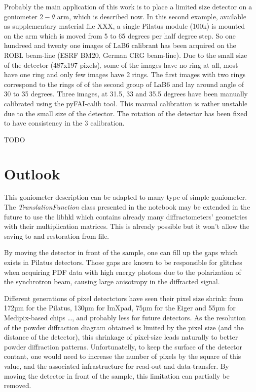 \documentclass[preprint]{iucr}              %
\begin{document}
Probably the main application of this work is to place a limited size detector
on a goniometer $2-\theta$ arm, which is described now.
In this second example, available as supplementary material file XXX, a single
Pilatus module (100k) is mounted on the arm which is moved from 5 to 65 degrees per half
degree step. 
So one hundreed and twenty one images of LaB6 calibrant has been acquired on the
ROBL beam-line (ESRF BM20, German CRG beam-line).
Due to the small size of the detector (487x197 pixels),
some of the images have no ring at all, most have one ring and only few images
have 2 rings.
The first images with two rings correspond to the rings of of the second group
of LaB6 and lay around angle of 30 to 35 degrees.
Three images, at 31.5, 33 and 35.5 degrees have been manually calibrated using
the pyFAI-calib tool.
This manual calibration is rather unstable due to the small size of the
detector. 
The rotation of the detector has been fixed to have consistency in the 3
calibration.

TODO

\section{Outlook}

This goniometer description can be adapted to many type of simple goniometer.
The \textit{TranslationFunction} class presented in the notebook may be extended
in the future to use the libhkl\cite{picca} which contains already many
diffractometers' geometries with their multiplication matrices. 
This is already possible but it won't allow the saving to and restoration from
file. 

By moving the detector in front of the sample, one can fill up the
gaps which exists in Pilatus detectors. Those gaps are known to be responsible for glitches
when acquiring PDF data with high energy photons due to the
polarization of the synchrotron beam, causing large anisotropy in the
diffracted signal.

Different generations of pixel detectctors have seen their pixel size
shrink:
from 172µm for the Pilatus, 130µm for ImXpad, 75µm for the Eiger and 55µm for
Medipix-based chips \ldots, and probably less for future detectors. 
As the resolution of the powder diffraction diagram obtained is limited by the
pixel size (and the distance of the detector), this shrinkage of pixel-size
leads naturally to better powder diffraction patterns. 
Unfortunatelly, to keep the surface of the detector contant, one would need
to increase the number of pixels by the square of this value, and the associated
infrastructure for read-out and data-transfer. 
By moving the detector in front of the sample, this limitation can partially be
removed.
\end{document}
